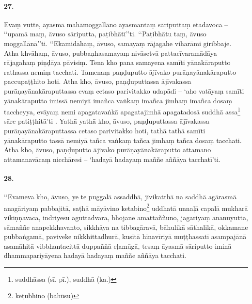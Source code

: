 \paragraph{27.} Evaṃ vutte, āyasmā mahāmoggallāno āyasmantaṃ sāriputtaṃ etadavoca – ‘‘upamā maṃ, āvuso sāriputta, paṭibhātī’’ti. ‘‘Paṭibhātu taṃ, āvuso moggallānā’’ti. ‘‘Ekamidāhaṃ, āvuso, samayaṃ rājagahe viharāmi giribbaje. Atha khvāhaṃ, āvuso, pubbaṇhasamayaṃ nivāsetvā pattacīvaramādāya rājagahaṃ piṇḍāya pāvisiṃ. Tena kho pana samayena samīti yānakāraputto rathassa nemiṃ tacchati. Tamenaṃ paṇḍuputto ājīvako purāṇayānakāraputto paccupaṭṭhito hoti. Atha kho, āvuso, paṇḍuputtassa ājīvakassa purāṇayānakāraputtassa evaṃ cetaso parivitakko udapādi – ‘aho vatāyaṃ samīti yānakāraputto imissā nemiyā imañca vaṅkaṃ imañca jimhaṃ imañca dosaṃ taccheyya, evāyaṃ nemi apagatavaṅkā apagatajimhā apagatadosā suddhā assa\footnote{suddhāssa (sī. pī.), suddhā (ka.)} sāre patiṭṭhitā’ti . Yathā yathā kho, āvuso, paṇḍuputtassa ājīvakassa purāṇayānakāraputtassa cetaso parivitakko hoti, tathā tathā samīti yānakāraputto tassā nemiyā tañca vaṅkaṃ tañca jimhaṃ tañca dosaṃ tacchati. Atha kho, āvuso, paṇḍuputto ājīvako purāṇayānakāraputto attamano attamanavācaṃ nicchāresi – ‘hadayā hadayaṃ maññe aññāya tacchatī’ti.

\paragraph{28.} ‘‘Evameva kho, āvuso, ye te puggalā assaddhā, jīvikatthā na saddhā agārasmā anagāriyaṃ pabbajitā, saṭhā māyāvino ketabino\footnote{keṭubhino (bahūsu)} uddhatā unnaḷā capalā mukharā vikiṇṇavācā, indriyesu aguttadvārā, bhojane amattaññuno, jāgariyaṃ ananuyuttā, sāmaññe anapekkhavanto, sikkhāya na tibbagāravā, bāhulikā sāthalikā, okkamane pubbaṅgamā, paviveke nikkhittadhurā, kusītā hīnavīriyā muṭṭhassatī asampajānā asamāhitā vibbhantacittā duppaññā eḷamūgā, tesaṃ āyasmā sāriputto iminā dhammapariyāyena hadayā hadayaṃ maññe aññāya tacchati.

